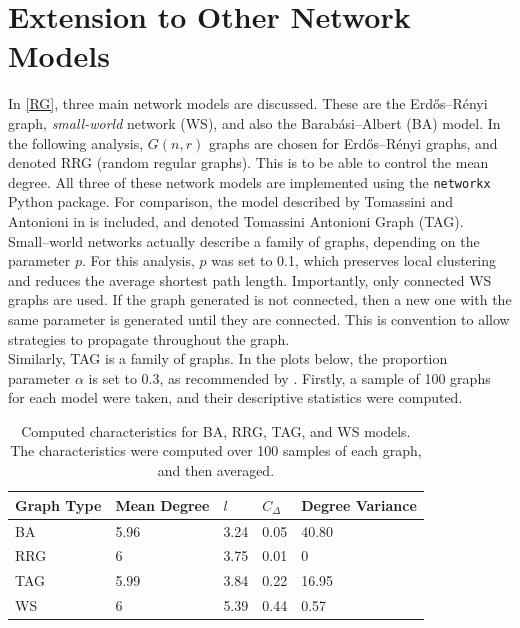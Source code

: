 \section{Extension to Other Network Models} \label{other_networks}

In \ref{RG}, three main network models are discussed. These are the Erd\H{o}s--R\'enyi graph, \emph{small-world} network (WS), and also the Barab\'{a}si--Albert (BA) model. In the following analysis, $G(n,r)$ graphs are chosen for Erd\H{o}s--R\'enyi graphs, and denoted RRG (random regular graphs). This is to be able to control the mean degree. All three of these network models are implemented using the \verb+networkx+ Python package. For comparison, the model described by Tomassini and Antonioni in \cite{RN51} is included, and denoted Tomassini Antonioni Graph (TAG). \\

Small--world networks actually describe a family of graphs, depending on the parameter $p$. For this analysis, $p$ was set to 0.1, which preserves local clustering and reduces the average shortest path length. Importantly, only connected WS graphs are used. If the graph generated is not connected, then a new one with the same parameter is generated until they are connected. This is convention to allow strategies to propagate throughout the graph. \\

Similarly, TAG is a family of graphs. In the plots below, the proportion parameter $\alpha$ is set to 0.3, as recommended by \cite{RN49}. Firstly, a sample of 100 graphs for each model were taken, and their descriptive statistics were computed. \\


\FloatBarrier

    

\begin{table}[!h]
\begin{center}
\begin{tabular}{|l|l|l|l|l|}
\hline
Graph Type & Mean Degree & $l$ & $C_\Delta$ & Degree Variance \\ \hline
BA         & 5.96        & 3.24                         & 0.05                   & 40.80           \\ \hline
RRG        & 6           & 3.75                         & 0.01                   & 0               \\ \hline
TAG        & 5.99        & 3.84                         & 0.22                   & 16.95           \\ \hline
WS         & 6           & 5.39                         & 0.44                   & 0.57            \\ \hline
\end{tabular}
\caption{Computed characteristics for BA, RRG, TAG, and WS models. The characteristics were computed over 100 samples of each graph, and then averaged. } \label{graph_stats}
\end{center}
\end{table}

